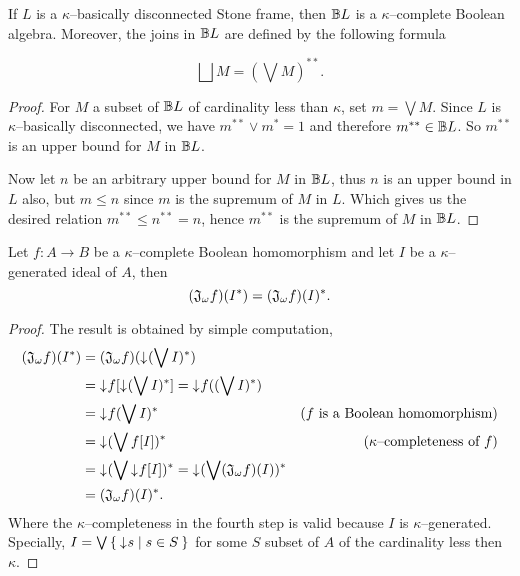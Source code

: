 \begin{lemma}\label{p:kappaComplStoneFrm}
    If $L$ is a $\kappa$--basically disconnected Stone frame, then $\mathbb{B} L$ is a $\kappa$--complete Boolean algebra. Moreover, the joins in $\mathbb{B} L$ are defined by the following formula

    $$\bigsqcup M = (\bigvee M)^{**}.$$
\end{lemma}
\begin{proof}
    For $M$ a subset of $\mathbb{B} L$ of cardinality less than $\kappa$, set $m = \bigvee M$. Since $L$ is $\kappa$--basically disconnected, we have $m^{**} \vee m^* = 1$ and therefore $m^{**} \in \mathbb{B} L$. So $m^{**}$ is an upper bound for $M$ in $\mathbb{B} L$.

    Now let $n$ be an arbitrary upper bound for $M$ in $\mathbb{B} L$, thus $n$ is an upper bound in $L$ also, but $m \leq n$ since $m$ is the supremum of $M$ in $L$. Which gives us the desired relation $m^{**} \leq n^{**} = n$, hence $m^{**}$ is the supremum of $M$ in $\mathbb{B} L$.
\end{proof}

\begin{observation}
    Let $f\colon A \to B$ be a $\kappa$--complete Boolean homomorphism and let $I$ be a $\kappa$--generated ideal of $A$, then
    $$(\mathfrak{J}_{\omega} f)(I^*) = (\mathfrak{J}_{\omega} f)(I)^*.$$
\end{observation}
\begin{proof}
    The result is obtained by simple computation,
    \begin{align*}
        (\mathfrak{J}_{\omega} f)(I^*) &= (\mathfrak{J}_{\omega} f)(\mathord{\downarrow}\mkern1mu (\bigvee I)^*) \\
                &= \mathord{\downarrow}\mkern1mu f[\mathord{\downarrow}\mkern1mu (\bigvee I)^*] = \mathord{\downarrow}\mkern1mu f((\bigvee I)^*) \\
                &= \mathord{\downarrow}\mkern1mu f(\bigvee I)^* & \text{($f$ is a Boolean homomorphism)} \\
                &= \mathord{\downarrow}\mkern1mu (\bigvee f[I])^* & \text{($\kappa$--completeness of $f$)} \\
                &= \mathord{\downarrow}\mkern1mu (\bigvee \mathord{\downarrow}\mkern1mu f[I])^* = \mathord{\downarrow}\mkern1mu (\bigvee (\mathfrak{J}_{\omega} f)(I))^* \\
                &= (\mathfrak{J}_{\omega} f)(I)^*.
    \end{align*}
    Where the $\kappa$--completeness in the fourth step is valid because $I$ is $\kappa$--generated. Specially, $I = \bigvee \Set{ \mathord{\downarrow}\mkern1mus | s \in S }$ for some $S$ subset of $A$ of the cardinality less then $\kappa$.
\end{proof}


